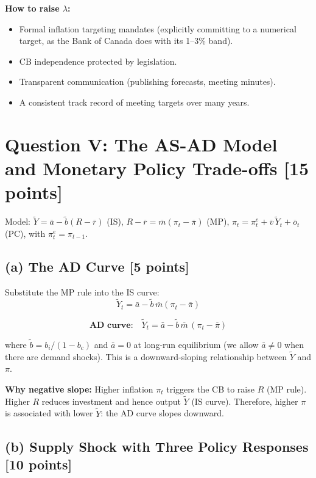 \documentclass[letterpaper,12pt]{article}
\begin{document}
\textbf{How to raise $\lambda$:}
\begin{itemize}
  \item Formal inflation targeting mandates (explicitly committing to a numerical target, as the Bank of Canada does with its 1--3\% band).
  \item CB independence protected by legislation.
  \item Transparent communication (publishing forecasts, meeting minutes).
  \item A consistent track record of meeting targets over many years.
\end{itemize}


\section*{Question V: The AS-AD Model and Monetary Policy Trade-offs [15 points]}

\noindent Model: $\widetilde{Y} = \bar{a} - \tilde{b}(R-\overline{r})$ (IS), $R - \overline{r} = \overline{m}(\pi_t - \overline{\pi})$ (MP), $\pi_t = \pi^e_t + \overline{v}\,\widetilde{Y}_t + \overline{o}_t$ (PC), with $\pi^e_t = \pi_{t-1}$.

\subsection*{(a) The AD Curve [5 points]}

Substitute the MP rule into the IS curve:
\[
\widetilde{Y}_t = \bar{a} - \tilde{b}\,\overline{m}(\pi_t - \overline{\pi})
\]

\textcolor{sol}{
\[
\textbf{AD curve:} \quad \widetilde{Y}_t = \bar{a} - \tilde{b}\,\overline{m}\,(\pi_t - \overline{\pi})
\]
}

where $\tilde{b} = b_i/(1-b_c)$ and $\bar{a} = 0$ at long-run equilibrium (we allow $\bar{a} \neq 0$ when there are demand shocks). This is a downward-sloping relationship between $\widetilde{Y}$ and $\pi$.

\textbf{Why negative slope:} Higher inflation $\pi_t$ triggers the CB to raise $R$ (MP rule). Higher $R$ reduces investment and hence output $\widetilde{Y}$ (IS curve). Therefore, higher $\pi$ is associated with lower $\widetilde{Y}$: the AD curve slopes downward.

\subsection*{(b) Supply Shock with Three Policy Responses [10 points]}
\end{document}
